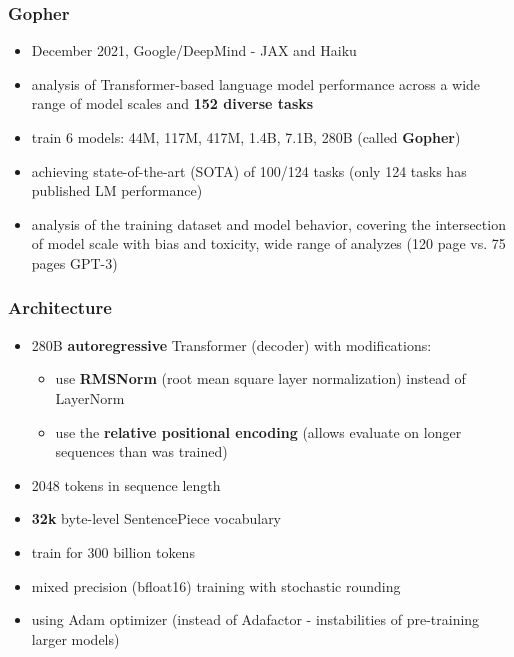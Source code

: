 \documentclass{beamer}
\begin{document}
\begin{frame}
    \frametitle{Gopher \cite{gopher}}
    \begin{itemize}
        \item December 2021, Google/DeepMind - JAX and Haiku
        \item analysis of Transformer-based language model performance across a wide range of model scales and \textbf{152 diverse tasks}
        \item train 6 models: 44M, 117M, 417M, 1.4B, 7.1B, 280B (called \textbf{Gopher})
        \item achieving state-of-the-art (SOTA) of 100/124 tasks (only 124 tasks has published LM performance)
        \item analysis of the training dataset and model behavior, covering the intersection of model scale with bias and toxicity, wide range of analyzes (120 page vs. 75 pages GPT-3)
    \end{itemize}
\end{frame}

\begin{frame}
    \frametitle{Architecture}
    \begin{itemize}
        \item 280B \textbf{autoregressive} Transformer (decoder) with modifications:
        \begin{itemize}
            \item use \textbf{RMSNorm} (root mean square layer normalization) instead of LayerNorm
            \item use the \textbf{relative positional encoding} (allows evaluate on longer sequences than was trained)
        \end{itemize}
        \item 2048 tokens in sequence length
        \item \textbf{32k} byte-level SentencePiece vocabulary
        \item train for 300 billion tokens
        \item mixed precision (bfloat16) training with stochastic rounding
        \item using Adam optimizer (instead of Adafactor - instabilities of pre-training larger models)
    \end{itemize}
\end{frame}
\end{document}
